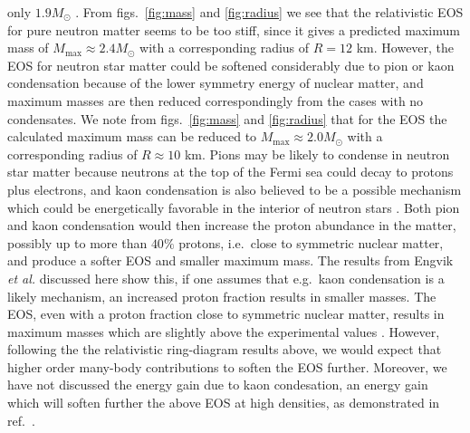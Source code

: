 only $1.9 M_{\odot}$ \cite{thorsett93}. From figs.\ \ref{fig:mass}
and \ref{fig:radius} we see that the relativistic EOS for pure neutron
matter seems to be too stiff, since it gives a predicted 
maximum mass of $M_{\mathrm{max}}\approx 2.4 M_{\odot}$ with
a corresponding radius of $R=12$ km. However, the EOS for neutron star
matter could be softened considerably due to pion or kaon
condensation because of the lower symmetry energy of nuclear matter,
and maximum masses are then reduced correspondingly
from the cases with no condensates. We note from figs.\ \ref{fig:mass}
and \ref{fig:radius} that for the EOS the calculated maximum mass
can be reduced to $M_{\mathrm{max}}\approx 2.0 M_{\odot}$
with a corresponding radius of $R\approx 10$ km. Pions may be likely
to condense in neutron star matter because neutrons at the top of
the Fermi sea could decay to protons plus electrons,
and kaon condensation is also believed to be a possible mechanism
which could be energetically favorable in the interior of neutron
stars \cite{brown93,thorson93,brown93b}. Both pion and kaon
condensation would then increase the proton abundance in the matter,
possibly up to more than $40\%$ protons, i.e.\ close to symmetric
nuclear matter, and produce a softer EOS and smaller maximum mass.
The results from Engvik {\em et al.}
\cite{lhobo94} discussed here show this, if one assumes that e.g.\ 
kaon condensation is
a likely mechanism, an increased proton fraction results in smaller
masses. The EOS, even with a proton fraction close to
symmetric nuclear matter, results in maximum masses which are slightly
above the experimental values \cite{thorsett93}. However, following the
the relativistic ring-diagram results above, 
we would
expect that higher order many-body contributions to
soften the EOS further.  Moreover, we have not discussed the energy gain
due to kaon condesation, an energy gain which will soften further
the above EOS at high densities, as demonstrated in ref.\ \cite{thorson93}.

















